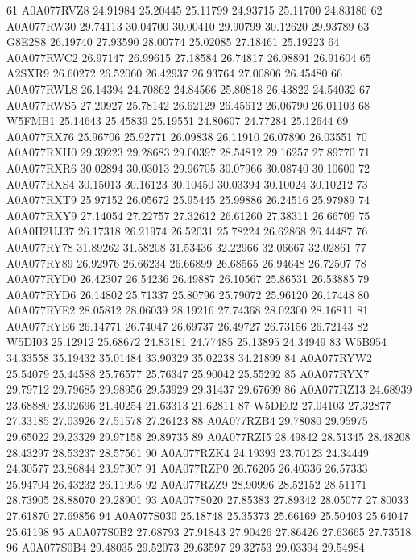 \documentclass{beamer}
\begin{document}
\begin{frame}[fragile]
\begin{itemize}
\begin{Schunk}
\begin{Soutput}
61   A0A077RVZ8 24.91984 25.20445 25.11799  24.93715  25.11700  24.83186
62   A0A077RW30 29.74113 30.04700 30.00410  29.90799  30.12620  29.93789
63       G8E2S8 26.19740 27.93590 28.00774  25.02085  27.18461  25.19223
64   A0A077RWC2 26.97147 26.99615 27.18584  26.74817  26.98891  26.91604
65       A2SXR9 26.60272 26.52060 26.42937  26.93764  27.00806  26.45480
66   A0A077RWL8 26.14394 24.70862 24.84566  25.80818  26.43822  24.54032
67   A0A077RWS5 27.20927 25.78142 26.62129  26.45612  26.06790  26.01103
68       W5FMB1 25.14643 25.45839 25.19551  24.80607  24.77284  25.12644
69   A0A077RX76 25.96706 25.92771 26.09838  26.11910  26.07890  26.03551
70   A0A077RXH0 29.39223 29.28683 29.00397  28.54812  29.16257  27.89770
71   A0A077RXR6 30.02894 30.03013 29.96705  30.07966  30.08740  30.10600
72   A0A077RXS4 30.15013 30.16123 30.10450  30.03394  30.10024  30.10212
73   A0A077RXT9 25.97152 26.05672 25.95445  25.99886  26.24516  25.97989
74   A0A077RXY9 27.14054 27.22757 27.32612  26.61260  27.38311  26.66709
75   A0A0H2UJ37 26.17318 26.21974 26.52031  25.78224  26.62868  26.44487
76   A0A077RY78 31.89262 31.58208 31.53436  32.22966  32.06667  32.02861
77   A0A077RY89 26.92976 26.66234 26.66899  26.68565  26.94648  26.72507
78   A0A077RYD0 26.42307 26.54236 26.49887  26.10567  25.86531  26.53885
79   A0A077RYD6 26.14802 25.71337 25.80796  25.79072  25.96120  26.17448
80   A0A077RYE2 28.05812 28.06039 28.19216  27.74368  28.02300  28.16811
81   A0A077RYE6 26.14771 26.74047 26.69737  26.49727  26.73156  26.72143
82       W5DI03 25.12912 25.68672 24.83181  24.77485  25.13895  24.34949
83       W5B954 34.33558 35.19432 35.01484  33.90329  35.02238  34.21899
84   A0A077RYW2 25.54079 25.44588 25.76577  25.76347  25.90042  25.55292
85   A0A077RYX7 29.79712 29.79685 29.98956  29.53929  29.31437  29.67699
86   A0A077RZ13 24.68939 23.68880 23.92696  21.40254  21.63313  21.62811
87       W5DE02 27.04103 27.32877 27.33185  27.03926  27.51578  27.26123
88   A0A077RZB4 29.78080 29.95975 29.65022  29.23329  29.97158  29.89735
89   A0A077RZI5 28.49842 28.51345 28.48208  28.43297  28.53237  28.57561
90   A0A077RZK4 24.19393 23.70123 24.34449  24.30577  23.86844  23.97307
91   A0A077RZP0 26.76205 26.40336 26.57333  25.94704  26.43232  26.11995
92   A0A077RZZ9 28.90996 28.52152 28.51171  28.73905  28.88070  29.28901
93   A0A077S020 27.85383 27.89342 28.05077  27.80033  27.61870  27.69856
94   A0A077S030 25.18748 25.35373 25.66169  25.50403  25.64047  25.61198
95   A0A077S0B2 27.68793 27.91843 27.90426  27.86426  27.63665  27.73518
96   A0A077S0B4 29.48035 29.52073 29.63597  29.32753  29.03394  29.54984

\end{Soutput}
\end{Schunk}
\end{itemize}
\end{frame}
\end{document}
